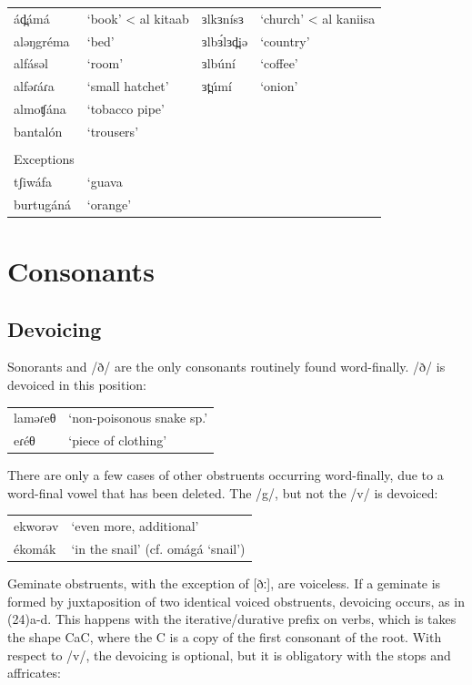 \ea
\begin{tabular}[t]{llll}
ád̪ámá		&	‘book’	< al kitaab	&	ɜlkɜnísɜ&	‘church’  < al kaniisa	\\
aləŋgréma	&	‘bed’			&	ɜlbɜ́lɜd̪iə	&	‘country’\\
alfásəl		&	‘room’ 			&	ɜlbúní		&	‘coffee’\\
alfəɾáɾa	&	‘small hatchet’	&	ɜt̪úmí		&	‘onion’\\
almoʧána	&	‘tobacco pipe’\\
bantalón	&	‘trousers’\\
&	\\
Exceptions\\
tʃiwáfa		&	‘guava\\
burtugáná	&	‘orange’\\
\end{tabular}
\z

\section{Consonants}
\subsection{Devoicing}
Sonorants and /ð/ are the only consonants routinely found word-finally. /ð/ is devoiced in this position:
\ea
\begin{tabular}[t]{ll}
	laməɾeθ	&	‘non-poisonous snake sp.’\\
	eɾéθ	&	‘piece of clothing’\\
\end{tabular}
\z

There are only a few cases of other obstruents occurring word-finally, due to a word-final vowel that has been deleted. The /g/, but not the /v/ is devoiced:

\ea
\begin{tabular}[t]{ll}
	ekworəv		&	‘even more, additional’\\
	ékomák		&	‘in the snail’	(cf. omágá ‘snail’)\\
\end{tabular}
\z

Geminate obstruents, with the exception of [ðː], are voiceless. If a geminate is formed by juxtaposition of two identical voiced obstruents, devoicing occurs, as in (24)a-d. This happens with the iterative/durative prefix on verbs, which is takes the shape CaC, where the C is a copy of the first consonant of the root. With respect to /v/, the devoicing is optional, but it is obligatory with the stops and affricates:

